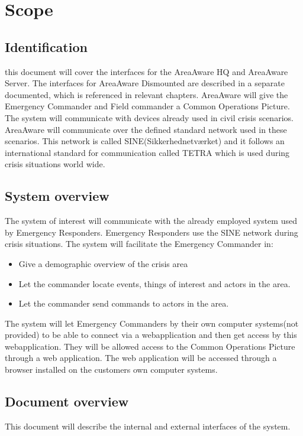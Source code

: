 \label{chp_scope}
\chapter{Scope}

\section{Identification}
this document will cover the interfaces for the AreaAware HQ and AreaAware Server. The interfaces for AreaAware Dismounted are described in a separate documented, which is referenced in relevant chapters.
AreaAware will give the Emergency Commander and Field commander a Common Operations Picture. The system will communicate with devices already used in civil crisis scenarios. AreaAware will communicate over the defined standard network used in these scenarios. 
This network is called SINE(Sikkerhednetværket) and it follows an international standard for communication called TETRA which is used during crisis situations world wide.

\section{System overview}
The system of interest will communicate with the already employed system used by Emergency Responders. Emergency Responders use the SINE network during crisis situations. The system will facilitate the Emergency Commander in:

\begin{itemize}
	\item  Give a demographic overview of the crisis area
	\item Let the commander locate events, things of interest and actors in the area.
	\item Let the commander send commands to actors in the area.
\end{itemize}

The system will let Emergency Commanders by their own computer systems(not provided) to be able to connect via a webapplication and then get access by this webapplication. They will be allowed access to the Common Operations Picture through a web application. The web application will be accessed through a browser installed on the customers own computer systems.


\section{Document overview}
This document will describe the internal and external interfaces of the system.


